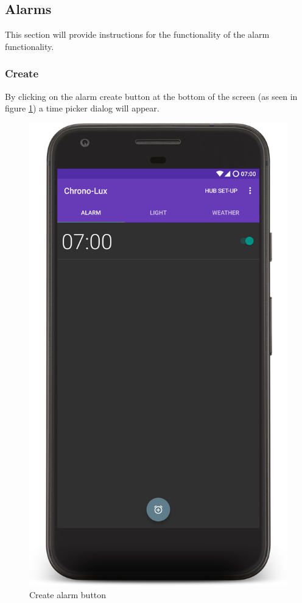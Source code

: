 \subsection{Alarms}\label{alarms}

This section will provide instructions for the functionality of the
alarm functionality.

\subsubsection{Create}\label{create}

By clicking on the alarm create button at the bottom of the screen (as
seen in figure \ref{fig:addAlarm}) a time picker dialog will appear.

\begin{figure}[H]
  \centering
  \includegraphics[scale=0.1]{Images/addAlarm.png}
  \caption{Create alarm button}
  \label{fig:addAlarm}
\end{figure}

